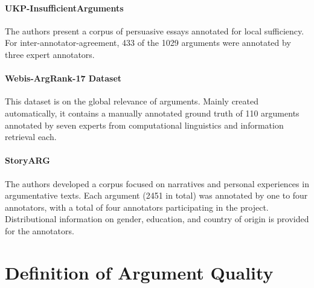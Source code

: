 \paragraph{UKP-InsufficientArguments \cite{stab-gurevych-2017-recognizing}}
The authors present a corpus of persuasive essays annotated for local sufficiency. For inter-annotator-agreement, 433 of the 1029 arguments were annotated by three expert annotators.

\paragraph{Webis-ArgRank-17 Dataset \cite{wachsmuth-etal-2017-pagerank}}
This dataset is on the global relevance of arguments. Mainly created automatically, it contains a manually annotated ground truth of 110 arguments annotated by seven experts from computational linguistics and information retrieval each.

\paragraph{StoryARG \cite{falk-lapesa-2023-storyarg}}
The authors developed a corpus focused on narratives and personal experiences in argumentative texts. Each argument (2451 in total) was annotated by one to four annotators, with a total of four annotators participating in the project. Distributional information on gender, education, and country of origin is provided for the annotators.

\section{Definition of Argument Quality}
\label{app:taxonomy}

